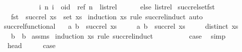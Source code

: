 \begin{isabellebody}
\ \ \ \ \ \ \ \ \ \ \ {\isacharbraceleft}{\isacharparenleft}i{\isacharcomma}\ n{\isacharparenright}{\isachardot}\ i\ {\isacharequal}\ oid\ {\isasymand}\ {\isacharparenleft}ref{\isacharcomma}\ n{\isacharparenright}\ {\isasymin}\ list{\isacharunderscore}rel{\isacharbraceright}\isanewline
\ \ \ \ \ \ else\ list{\isacharunderscore}rel{\isacharparenright}{\isachardoublequoteclose}\isanewline
\isanewline
{}\isamarkupfalse%
\ succ{\isacharunderscore}rel{\isacharunderscore}set{\isacharunderscore}fst{\isacharcolon}\isanewline
\ \ \ {\isachardoublequoteopen}fst\ {\isacharbackquote}\ {\isacharparenleft}succ{\isacharunderscore}rel\ xs{\isacharparenright}\ {\isacharequal}\ set\ xs{\isachardoublequoteclose}\isanewline
%
\isadelimproof
%
\endisadelimproof
%
\isatagproof
{}\isamarkupfalse%
\ {\isacharparenleft}induction\ xs\ rule{\isacharcolon}\ succ{\isacharunderscore}rel{\isachardot}induct{\isacharcomma}\ auto{\isacharparenright}%
\endisatagproof
{\isafoldproof}%
%
\isadelimproof
\isanewline
%
\endisadelimproof
\isanewline
{}\isamarkupfalse%
\ succ{\isacharunderscore}rel{\isacharunderscore}functional{\isacharcolon}\isanewline
\ \ \ {\isachardoublequoteopen}{\isacharparenleft}a{\isacharcomma}\ b{}{\isacharparenright}\ {\isasymin}\ succ{\isacharunderscore}rel\ xs{\isachardoublequoteclose}\isanewline
\ \ \ \ \ {\isachardoublequoteopen}{\isacharparenleft}a{\isacharcomma}\ b{}{\isacharparenright}\ {\isasymin}\ succ{\isacharunderscore}rel\ xs{\isachardoublequoteclose}\isanewline
\ \ \ \ \ {\isachardoublequoteopen}distinct\ xs{\isachardoublequoteclose}\isanewline
\ \ \ {\isachardoublequoteopen}b{}\ {\isacharequal}\ b{}{\isachardoublequoteclose}\isanewline
%
\isadelimproof
%
\endisadelimproof
%
\isatagproof
{}\isamarkupfalse%
\ assms\ \isamarkupfalse%
{\isacharparenleft}induction\ xs\ rule{\isacharcolon}\ succ{\isacharunderscore}rel{\isachardot}induct{\isacharparenright}\isanewline
\ \ \isamarkupfalse%
\ {}\isanewline
\ \ \isamarkupfalse%
\ \isamarkupfalse%
\ {\isacharquery}case\ \isamarkupfalse%
\ simp\isanewline
{}\isamarkupfalse%
\isanewline
\ \ \isamarkupfalse%
\ {\isacharparenleft}{}\ head{\isacharparenright}\isanewline
\ \ \isamarkupfalse%
\ \isamarkupfalse%
\ {\isacharquery}case\ \isamarkupfalse%

\end{isabellebody}
